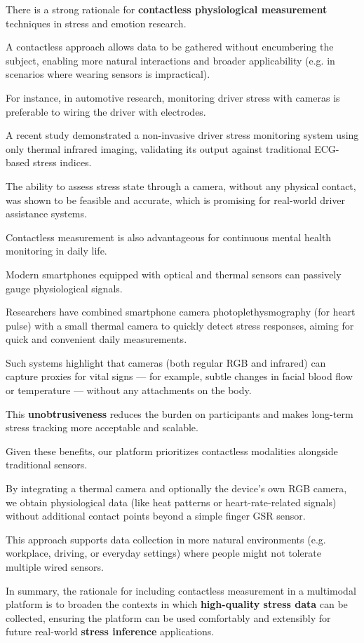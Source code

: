 There is a strong rationale for \textbf{contactless physiological measurement}
 techniques in stress and emotion research.

A contactless approach allows data to be gathered without encumbering the subject, enabling more natural interactions and broader applicability (e.g. in scenarios where wearing sensors is impractical).

For instance, in automotive research, monitoring driver stress with cameras is preferable to wiring the driver with electrodes.

A recent study demonstrated a non-invasive driver stress monitoring system using only thermal infrared imaging, validating its output against traditional ECG-based stress indices.

The ability to assess stress state through a camera, without any physical contact, was shown to be feasible and accurate, which is promising for real-world driver assistance systems.

Contactless measurement is also advantageous for continuous mental health monitoring in daily life.

Modern smartphones equipped with optical and thermal sensors can passively gauge physiological signals.

Researchers have combined smartphone camera photoplethysmography (for heart pulse) with a small thermal camera to quickly detect stress responses, aiming for quick and convenient daily measurements.

Such systems highlight that cameras (both regular RGB and infrared) can capture proxies for vital signs --- for example, subtle changes in facial blood flow or temperature --- without any attachments on the body.

This \textbf{unobtrusiveness}
 reduces the burden on participants and makes long-term stress tracking more acceptable and scalable.

Given these benefits, our platform prioritizes contactless modalities alongside traditional sensors.

By integrating a thermal camera and optionally the device's own RGB camera, we obtain physiological data (like heat patterns or heart-rate-related signals) without additional contact points beyond a simple finger GSR sensor.

This approach supports data collection in more natural environments (e.g. workplace, driving, or everyday settings) where people might not tolerate multiple wired sensors.

In summary, the rationale for including contactless measurement in a multimodal platform is to broaden the contexts in which \textbf{high-quality stress data}
 can be collected, ensuring the platform can be used comfortably and extensibly for future real-world \textbf{stress inference}
 applications.

